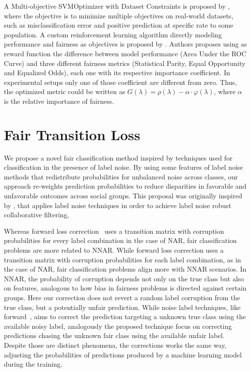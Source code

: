 A Multi-objective SVMOptimizer with Dataset Constraints is proposed by \cite{Goh2016}, where the objective is to minimize multiple objectives on real-world datasets, such as misclassification error and positive prediction at specific rate to some population. A custom reinforcement learning algorithm directly modeling performance and fairness as objectives is proposed by \cite{Petrovic2021}. Authors proposes using as reward function the difference between model performance (Area Under the ROC Curve) and three different fairness metrics (Statistical Parity, Equal Opportunity and Equalized Odds), each one with its respective importance coefficient. In experimental setups only one of those coefficient are different from zero. Thus, the optimized metric could be written as $G(\lambda) = \rho(\lambda) - \alpha \cdot \varphi(\lambda)$, where $\alpha$ is the relative importance of fairness.

\section{Fair Transition Loss} \label{sec:proposal}

We propose a novel fair classification method inspired by techniques used for classification in the presence of label noise. By using some features of label noise methods that redistribute probabilities for unbalanced noise across classes, our approach re-weights prediction probabilities to reduce disparities in favorable and unfavorable outcomes across social groups. This proposal was originally inspired by \cite{Braida2018}, that applies label noise techniques in order to achieve label noise robust collaborative filtering,

Whereas forward loss correction~\citep{Patrini2017} uses a transition matrix with corruption probabilities for every label combination in the case of NAR, fair classification problems are more related to NNAR. While forward loss correction uses a transition matrix with corruption probabilities for each label combination, as in the case of NAR, fair classification problems align more with NNAR scenarios. In NNAR, the probability of corruption depends not only on the true class but also on features, analogous to how bias in fairness problems is directed against certain groups. Here our correction does not revert a random label corruption from the true class, but a potentially unfair prediction. While noise label techniques, like forward~\citep{Patrini2017}, aims to correct the prediction targeting a unknown true class using the available noisy label, analogously the proposed technique focus on correcting predictions chasing the unknown fair class using the available unfair label. Despite those are distinct phenomena, the corrections works the same way, adjusting the probabilities of predictions produced by a machine learning model during the training. 

